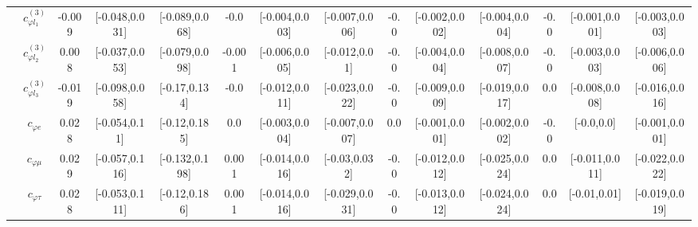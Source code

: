 \documentclass{article}
\begin{document}
\begin{table}[H]
\begin{tabular}{|c|c|c|c|c|c|c|c|c|c|c|c|c|c|}
 & $c_{\varphi l_1}^{(3)}$ & -0.009                             & [-0.048,0.031]                                 & [-0.089,0.068] & -0.0                             & [-0.004,0.003]                                 & [-0.007,0.006] & -0.0                             & [-0.002,0.002]                                 & [-0.004,0.004] & -0.0                             & [-0.001,0.001]                                 & [-0.003,0.003] \\ \cline{2-14}
 & $c_{\varphi l_2}^{(3)}$ & 0.008                             & [-0.037,0.053]                                 & [-0.079,0.098] & -0.001                             & [-0.006,0.005]                                 & [-0.012,0.01] & -0.0                             & [-0.004,0.004]                                 & [-0.008,0.007] & -0.0                             & [-0.003,0.003]                                 & [-0.006,0.006] \\ \cline{2-14}
 & $c_{\varphi l_3}^{(3)}$ & -0.019                             & [-0.098,0.058]                                 & [-0.17,0.134] & -0.0                             & [-0.012,0.011]                                 & [-0.023,0.022] & -0.0                             & [-0.009,0.009]                                 & [-0.019,0.017] & 0.0                             & [-0.008,0.008]                                 & [-0.016,0.016] \\ \cline{2-14}
 & $c_{\varphi e}$ & 0.028                             & [-0.054,0.11]                                 & [-0.12,0.185] & 0.0                             & [-0.003,0.004]                                 & [-0.007,0.007] & 0.0                             & [-0.001,0.001]                                 & [-0.002,0.002] & -0.0                             & [-0.0,0.0]                                 & [-0.001,0.001] \\ \cline{2-14}
 & $c_{\varphi \mu}$ & 0.029                             & [-0.057,0.116]                                 & [-0.132,0.198] & 0.001                             & [-0.014,0.016]                                 & [-0.03,0.032] & -0.0                             & [-0.012,0.012]                                 & [-0.025,0.024] & 0.0                             & [-0.011,0.011]                                 & [-0.022,0.022] \\ \cline{2-14}
 & $c_{\varphi \tau}$ & 0.028                             & [-0.053,0.111]                                 & [-0.12,0.186] & 0.001                             & [-0.014,0.016]                                 & [-0.029,0.031] & -0.0                             & [-0.013,0.012]                                 & [-0.024,0.024] & 0.0                             & [-0.01,0.01]                                 & [-0.019,0.019] \\ \cline{2-14}

\end{tabular}
\end{table}
\end{document}
